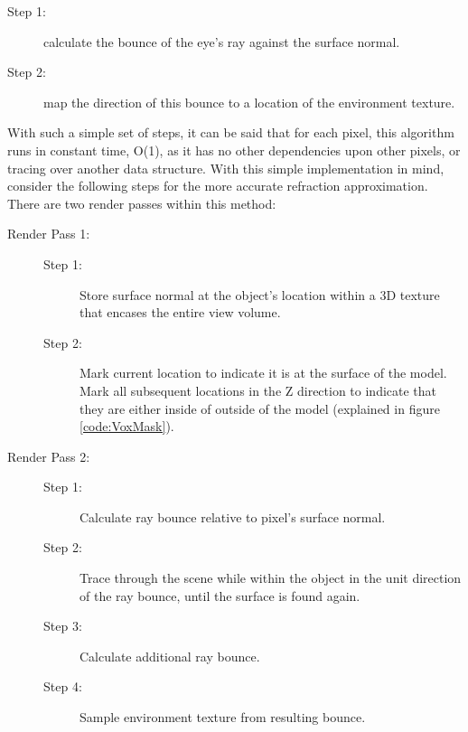 \documentclass[a4paper, 12pt]{article}
\begin{document}
\begin{description}

\item[Step 1:] calculate the bounce of the eye's ray against the surface
normal.

\item[Step 2:] map the direction of this bounce to a location of the
environment texture.

\end{description}

\noindent With such a simple set of steps, it can be said that for each pixel,
this algorithm runs in constant time, O(1), as it has no other dependencies
upon other pixels, or tracing over another data structure. With this simple
implementation in mind, consider the following steps for the more accurate
refraction approximation. There are two render passes within this method:

\begin{description}

\item[Render Pass 1:] \hfill

\begin{description} 

\item[Step 1:] Store surface normal at the object's location within a 3D
texture that encases the entire view volume.

\item[Step 2:] Mark current location to indicate it is at the surface of the
model. Mark all subsequent locations in the Z direction to indicate that they
are either inside of outside of the model (explained in figure
\ref{code:VoxMask}).

\end{description}

\item[Render Pass 2:] \hfill

\begin{description}

\item[Step 1:] Calculate ray bounce relative to pixel's surface normal.

\item[Step 2:] Trace through the scene while within the object in the unit direction of the ray bounce, until the surface is found again.

\item[Step 3:] Calculate additional ray bounce.

\item[Step 4:] Sample environment texture from resulting bounce.

\end{description}

\end{description}
\end{document}
